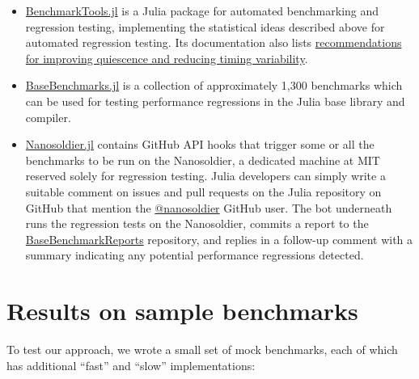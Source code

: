 \documentclass[conference]{IEEEtran}
\begin{document}
\begin{itemize}
\item
\href{https://github.com/JuliaCI/BenchmarkTools.jl}{BenchmarkTools.jl} is a Julia package
for automated benchmarking and regression testing, implementing the statistical ideas
described above for automated regression testing. Its documentation also lists
\href{https://github.com/JuliaCI/BenchmarkTools.jl/blob/60dfe83e5434c87b7311ca5d9f185f45752ed510/doc/linuxtips.md}{recommendations
for improving quiescence and reducing timing variability}.
\item
\href{https://github.com/JuliaCI/BaseBenchmarks.jl}{BaseBenchmarks.jl} is a collection of
approximately 1,300 benchmarks which can be used for testing performance regressions in the
Julia base library and compiler.
\item
\href{https://github.com/JuliaCI/Nanosoldier.jl}{Nanosoldier.jl} contains GitHub API hooks
that trigger some or all the benchmarks to be run on the Nanosoldier, a dedicated machine at
MIT reserved solely for regression testing. Julia developers can simply write a suitable
comment on issues and pull requests on the Julia repository on GitHub that mention the
\href{https://github.com/nanosoldier}{@nanosoldier} GitHub user. The bot underneath runs the
regression tests on the Nanosoldier, commits a report to the
\href{https://github.com/JuliaCI/BaseBenchmarkReports}{BaseBenchmarkReports} repository, and
replies in a follow-up comment with a summary indicating any potential performance
regressions detected.
\end{itemize}

\section{Results on sample benchmarks}

To test our approach, we wrote a small set of mock benchmarks, each of which has additional
``fast'' and ``slow'' implementations:
\end{document}
